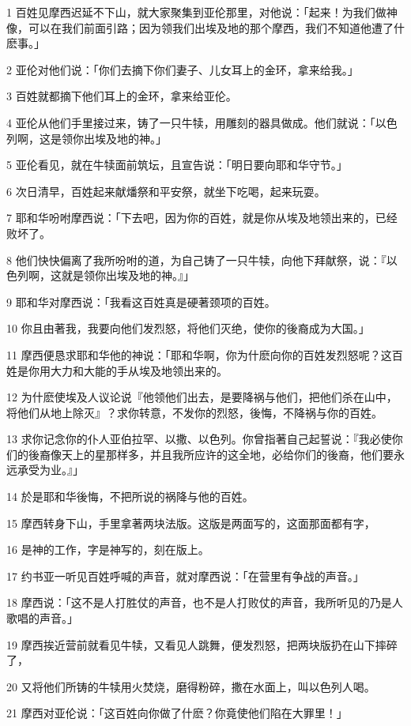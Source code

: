 \par 1 百姓见摩西迟延不下山，就大家聚集到亚伦那里，对他说：「起来！为我们做神像，可以在我们前面引路；因为领我们出埃及地的那个摩西，我们不知道他遭了什麽事。」
\par 2 亚伦对他们说：「你们去摘下你们妻子、儿女耳上的金环，拿来给我。」
\par 3 百姓就都摘下他们耳上的金环，拿来给亚伦。
\par 4 亚伦从他们手里接过来，铸了一只牛犊，用雕刻的器具做成。他们就说：「以色列啊，这是领你出埃及地的神。」
\par 5 亚伦看见，就在牛犊面前筑坛，且宣告说：「明日要向耶和华守节。」
\par 6 次日清早，百姓起来献燔祭和平安祭，就坐下吃喝，起来玩耍。
\par 7 耶和华吩咐摩西说：「下去吧，因为你的百姓，就是你从埃及地领出来的，已经败坏了。
\par 8 他们快快偏离了我所吩咐的道，为自己铸了一只牛犊，向他下拜献祭，说：『以色列啊，这就是领你出埃及地的神。』」
\par 9 耶和华对摩西说：「我看这百姓真是硬著颈项的百姓。
\par 10 你且由著我，我要向他们发烈怒，将他们灭绝，使你的後裔成为大国。」
\par 11 摩西便恳求耶和华他的神说：「耶和华啊，你为什麽向你的百姓发烈怒呢？这百姓是你用大力和大能的手从埃及地领出来的。
\par 12 为什麽使埃及人议论说『他领他们出去，是要降祸与他们，把他们杀在山中，将他们从地上除灭』？求你转意，不发你的烈怒，後悔，不降祸与你的百姓。
\par 13 求你记念你的仆人亚伯拉罕、以撒、以色列。你曾指著自己起誓说：『我必使你们的後裔像天上的星那样多，并且我所应许的这全地，必给你们的後裔，他们要永远承受为业。』」
\par 14 於是耶和华後悔，不把所说的祸降与他的百姓。
\par 15 摩西转身下山，手里拿著两块法版。这版是两面写的，这面那面都有字，
\par 16 是神的工作，字是神写的，刻在版上。
\par 17 约书亚一听见百姓呼喊的声音，就对摩西说：「在营里有争战的声音。」
\par 18 摩西说：「这不是人打胜仗的声音，也不是人打败仗的声音，我所听见的乃是人歌唱的声音。」
\par 19 摩西挨近营前就看见牛犊，又看见人跳舞，便发烈怒，把两块版扔在山下摔碎了，
\par 20 又将他们所铸的牛犊用火焚烧，磨得粉碎，撒在水面上，叫以色列人喝。
\par 21 摩西对亚伦说：「这百姓向你做了什麽？你竟使他们陷在大罪里！」
